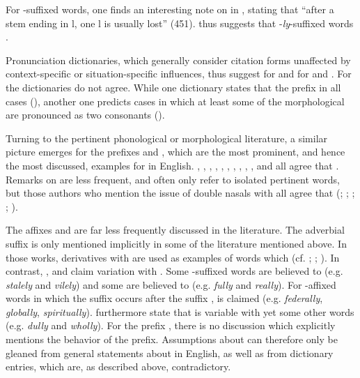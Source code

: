   For -suffixed words, one finds an interesting note on  in \cite{Wells.2008}, stating that ``after a stem ending in l, one l is usually lost'' (451). \cite{Wells.2008} thus suggests that \hbox{-}\textit{ly}-suffixed words .
 
 Pronunciation dictionaries, which generally consider citation forms unaffected by context-specific or situation-specific influences, thus suggest  for  and  for  and . For  the dictionaries do not agree. While one dictionary states that the prefix  in all cases (\citealt{Wells.2008}), another one predicts cases in which at least some of the morphological  are pronounced as two consonants (\citealt{Roach.2011}).
 
 
Turning to the pertinent phonological or morphological literature, a similar picture emerges for the prefixes  and , which are the most prominent, and hence the most discussed, examples for  in English. \citet[141]{Wijk.1966}, \citet[255]{OConnor.1973}, \citet[18]{Mohanan.1986}, \citet[119 ff]{Borowsky.1986}, \citet[111]{Catford.1988}, \citet[106]{Kreidler.1989}, \citet[251]{Ladefoged.1993}, \citet[18]{Harris.1994}, \citet[22]{Spencer.1996}, \citet[1055 f.]{CohenGoldberg.2013}, and \citet{Cruttenden.2014} all agree that  . Remarks on  are less frequent, and often only refer to isolated pertinent words, but those authors who mention the issue of double nasals with  all agree that   (\citealt[251]{Ladefoged.1993}; \citealt[18]{Mohanan.1986}; \citealt[18 ff]{Harris.1994}; \citealt[248]{Cruttenden.2014}; \citealt[1055 f]{CohenGoldberg.2013}).

The affixes  and  are far less frequently discussed in the literature. 
The adverbial suffix  is only mentioned implicitly in some of the literature mentioned above. In those works, derivatives with  are used as examples of words which  (cf. \citealt[141]{Wijk.1966}; \citealt[23]{Harris.1994}; \citealt[22]{Spencer.1996}). In contrast, \citet[82]{Bauer.2001}, \citet[353]{Giegerich.2012} and \citet[169]{Bauer.2013} claim variation with . Some -suffixed words are believed to  (e.g. \textit{stalely} and \textit{vilely}) and some are believed to  (e.g. \textit{fully} and \textit{really}). For -affixed words in which the suffix occurs after the suffix ,  is claimed (e.g.  \textit{federally}, \textit{globally}, \textit{spiritually}). \citet[169]{Bauer.2013} furthermore state that  is variable with yet some other words (e.g. \textit{dully} and \textit{wholly}). 
For the prefix , there is no discussion which explicitly mentions the  behavior of the prefix. Assumptions about  can therefore only be gleaned from general statements about  in English, as well as from dictionary entries, which are, as described above, contradictory. 

